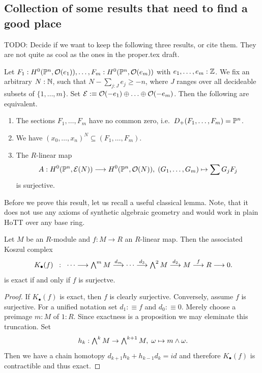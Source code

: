 
\subsection{Collection of some results that need to find a good place}

{\color{red} TODO: Decide if we want to keep the following three results, or cite them. They are not quite as cool as the ones in the proper.tex draft.}

\begin{proposition}
  \label{effective-nullstellensatz}
  Let $F_1 : H^0(\mathbb{P}^n,\mathcal{O}(e_1)), \hdots, F_m : H^0(\mathbb{P}^n,\mathcal{O}(e_m))$ with $e_1,\hdots,e_m : \mathbb Z$.
  We fix an arbitrary $N : \mathbb N$, such that $N - \sum_{j:J} e_j \geq -n$, where $J$ ranges over all decideable subsets of $\{1, \hdots, m\}$.
  Set $\mathcal{E} :\equiv \mathcal{O}(-e_1) \oplus \hdots \oplus \mathcal{O}(-e_m)$. Then the following are equivalent.
  \begin{enumerate}
    \item[i)] The sections $F_1,\hdots,F_m$ have no common zero, i.e.\ $D_+(F_1,\hdots,F_m) = \mathbb{P}^n$.
    \item[ii)] We have $ (x_0,\hdots,x_n)^N \subseteq (F_1,\hdots,F_m)$.
    \item[iii)] The $R$-linear map
      \[
        A : H^0(\mathbb{P}^n,\mathcal{E}(N)) \longrightarrow H^0(\mathbb{P}^n,\mathcal{O}(N)), \;
        (G_1,\hdots,G_m) \mapsto \sum G_jF_j
      \]
      is surjective.
  \end{enumerate}
\end{proposition}

Before we prove this result, let us recall a useful classical lemma.
Note, that it does not use any axioms of synthetic algebraic geometry and would work in plain HoTT over any base ring.

\begin{lemma}
  \label{exactness-criterion-Koszul-complex}
  Let $M$ be an $R$-module and $f : M \to R$ an $R$-linear map.
  Then the associated Koszul complex
  \[
    \textstyle
    K_\bullet(f) \;\;:\;\;
    \cdots          \longrightarrow
    \bigwedge^mM    \overset{d_m}{\longrightarrow}
    \cdots          \overset{d_3}{\longrightarrow}
    \bigwedge^2 M   \overset{d_2}{\longrightarrow}
    M               \overset{f}{\longrightarrow}
    R               \longrightarrow 0 \rlap{.}
  \]
  is exact if and only if $f$ is surjectve.
\end{lemma}

\begin{proof}
  If $K_\bullet(f)$ is exact, then $f$ is clearly surjective.
  Conversely, assume $f$ is surjective.
  For a unified notation set $d_1 :\equiv f$ and $d_0 :\equiv 0$.
  Merely choose a preimage $m:M$ of $1:R$.
  Since exactness is a proposition we may eleminate this truncation.
  Set
  \[
    \textstyle
    h_k : \bigwedge^kM \to \bigwedge^{k+1}M, \;
    \omega \mapsto m \wedge \omega \rlap{.}
  \]
  Then we have a chain homotopy $d_{k+1}h_k + h_{k-1}d_k = id$ and therefore $K_\bullet(f)$ is contractible and thus exact.
\end{proof}

